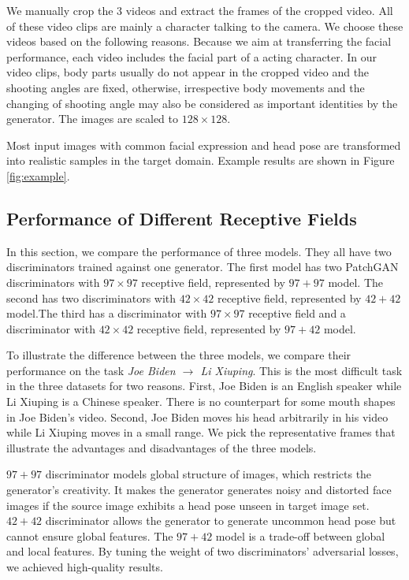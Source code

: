 \documentclass[letterpaper]{article} %
\newcommand{\zhiming}[1]{{\bf \color{blue} [Zhiming says: #1]}}
\begin{document}
	We manually crop the 3 videos and extract the frames of the cropped video. All of these video clips are mainly a character talking to the camera. We choose these videos based on the following reasons. Because we aim at transferring the facial performance, each video includes the facial part of a acting character. In our video clips, body parts usually do not appear in the cropped video and the shooting angles are fixed, otherwise, irrespective body movements and the changing of shooting angle may also be considered as important identities by the generator. %
	The images are scaled to $128\times128$. %
	
	Most input images with common facial expression and head pose are transformed into realistic samples in the target domain. Example results are shown in Figure \ref{fig:example}.
	
	
	
	\subsection{Performance of Different Receptive Fields}
	In this section, we compare the performance of three models. They all have two discriminators trained against one generator. The first model has two PatchGAN discriminators with $97\times97$ receptive field, represented by $97+97$ model. The second has two discriminators with $42\times42$ receptive field, represented by $42+42$ model.The third has a discriminator with $97\times97$ receptive field and a discriminator with $42\times42$ receptive field, represented by $97+42$ model. 
	
	To illustrate the difference between the three models, we compare their performance on the task \emph{Joe Biden $\rightarrow$ Li Xiuping}. This is the most difficult task in the three datasets for two reasons. First, Joe Biden is an English speaker while Li Xiuping is a Chinese speaker. There is no counterpart for some mouth shapes in Joe Biden's video. Second, Joe Biden moves his head arbitrarily in his video while Li Xiuping moves in a small range. We pick the representative frames that illustrate the advantages and disadvantages of the three models. 
	
	$97+97$ discriminator models global structure of images, which restricts the generator's creativity. It makes the generator generates noisy and distorted face images if the source image exhibits a head pose unseen in target image set. %
	$42+42$ discriminator allows the generator to generate uncommon head pose but cannot ensure global features. The $97+42$ model is a trade-off between global and local features. By tuning the weight of two discriminators' adversarial losses, we achieved high-quality results. 
	
\end{document}
